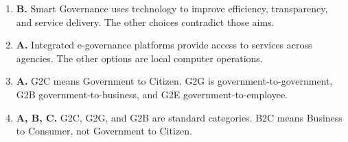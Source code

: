 \begin{enumerate}[label=\textbf{Q\arabic*.}, leftmargin=*]
\item \textbf{B.} Smart Governance uses technology to improve efficiency, transparency, and service delivery. The other choices contradict those aims.

\item \textbf{A.} Integrated e-governance platforms provide access to services across agencies. The other options are local computer operations.

\item \textbf{A.} G2C means Government to Citizen. G2G is government-to-government, G2B government-to-business, and G2E government-to-employee.

\item \textbf{A, B, C.} G2C, G2G, and G2B are standard categories. B2C means Business to Consumer, not Government to Citizen.

\end{enumerate}